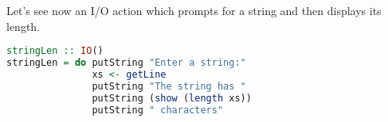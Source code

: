 Let's see now an I/O action which prompts for a string and then displays its length.

\begin{lstlisting}[language=Haskell]
stringLen :: IO()
stringLen = do putString "Enter a string:"
               xs <- getLine
               putString "The string has "
               putString (show (length xs))
               putString " characters"
\end{lstlisting}